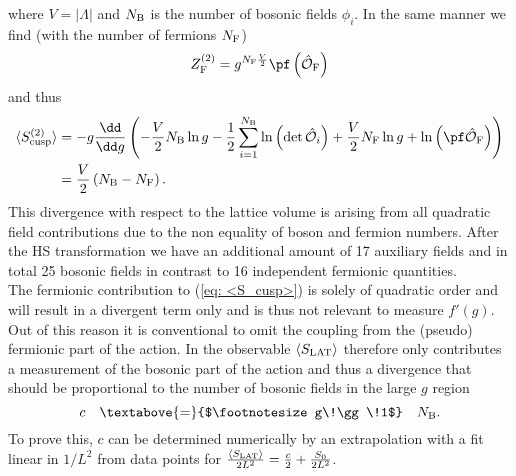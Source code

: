 %
%
where $V=\vert \mathit{\Lambda}\vert$ and $N_{\rm B}$ is the number of bosonic fields $\phi_{i}$. In the same manner we find (with the number of fermions $N_{\rm F}$)
%
%
\begin{equation}
Z_{\rm F}^{(2)}= g^{N_{\rm F}\frac{V}{2}} \pf \left(\hat{\mathcal{O}}_{\rm F} \right)
\end{equation}
%
%
and thus
%
%
\begin{equation}
\begin{alignedat}{2}
\langle S_{\rm cusp}^{(2)} \rangle &= -g \frac{\dd }{\dd g} \left( -\frac{V}{2}N_{\rm B} \ln g -\frac{1}{2} \sum\limits_{i=1}^{N_{\rm B}} \ln \left(\det \hat{\mathcal{O}}_{i}\right) + \frac{V}{2} N_{\rm F} \ln g + \ln \left( \pf \hat{\mathcal{O}}_{\rm F} \right) \right) \\
%
%
&= \frac{V}{2} \left(N_{\rm B} - N_{\rm F}\right).
\end{alignedat}
\end{equation}
%
%
This divergence with respect to the lattice volume is arising from all quadratic field contributions due to the non equality of boson and fermion numbers. After the HS transformation we have an additional amount of 17 auxiliary fields and in total 25 bosonic fields in contrast to 16 independent fermionic quantities. \\
The fermionic contribution to (\ref{eq: <S_cusp>}) is solely of quadratic order and will result in a divergent term only and is thus not relevant to measure $f'(g)$. Out of this reason it is conventional  to omit the coupling from the (pseudo) fermionic part of the action. In the observable $\langle S_{\rm LAT} \rangle$ therefore only contributes a measurement of the bosonic part of the action and thus a divergence that should be proportional to the number of bosonic fields in the large $g$ region
%
%
\begin{equation}
c\quad \textabove{=}{$\footnotesize g\!\gg\!1$} \quad N_{\rm B}.
\end{equation}
%
%
To prove this, $c$ can be determined numerically by an extrapolation with a fit linear in $1/L^{2}$ from data points for $\frac{\langle S_{\rm LAT}\rangle}{2L^{2}} = \frac{c}{2}+ \frac{S_{0}}{2L^{2}}$.